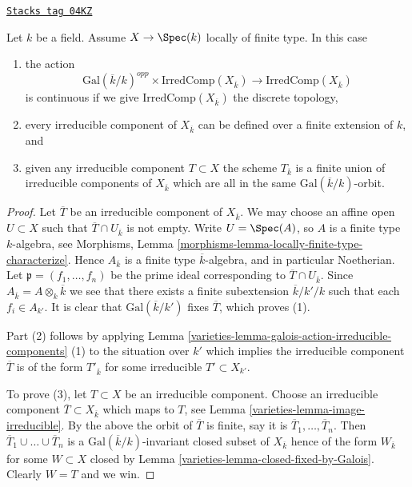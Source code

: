 \begin{lemma}
\label{varieties-lemma-galois-action-irreducible-components-locally-finite-type}
\href{https://stacks.math.columbia.edu/tag/04KZ}{\texttt{Stacks tag 04KZ}}

Let $k$ be a field.
Assume $X \to \Spec(k)$ locally of finite type.
In this case
\begin{enumerate}
\item the action
$$
\text{Gal}(\overline{k}/k)^{opp} \times \text{IrredComp}(X_{\overline{k}})
\longrightarrow
\text{IrredComp}(X_{\overline{k}})
$$
is continuous if we give $\text{IrredComp}(X_{\overline{k}})$ the discrete
topology,
\item every irreducible component of $X_{\overline{k}}$
can be defined over a finite extension of $k$, and
\item given any irreducible component $T \subset X$ the scheme
$T_{\overline{k}}$ is a finite union of irreducible components of
$X_{\overline{k}}$ which are all in the same
$\text{Gal}(\overline{k}/k)$-orbit.
\end{enumerate}
\end{lemma}

\begin{proof}

Let $\overline{T}$ be an irreducible component of $X_{\overline{k}}$.
We may choose an affine open $U \subset X$ such that
$\overline{T} \cap U_{\overline{k}}$ is not empty.
Write $U = \Spec(A)$, so $A$ is a finite type $k$-algebra, see
Morphisms, Lemma \ref{morphisms-lemma-locally-finite-type-characterize}.
Hence $A_{\overline{k}}$ is a finite type $\overline{k}$-algebra,
and in particular Noetherian. Let $\mathfrak p = (f_1, \ldots, f_n)$
be the prime ideal corresponding to $\overline{T} \cap U_{\overline{k}}$.
Since $A_{\overline{k}} = A \otimes_k \overline{k}$
we see that there exists a finite subextension
$\overline{k}/k'/k$ such that each $f_i \in A_{k'}$.
It is clear that $\text{Gal}(\overline{k}/k')$
fixes $\overline{T}$, which proves (1).

\medskip\noindent
Part (2) follows by applying
Lemma \ref{varieties-lemma-galois-action-irreducible-components} (1)
to the situation over $k'$ which implies the irreducible component
$\overline{T}$ is of the form $T'_{\overline{k}}$ for some irreducible
$T' \subset X_{k'}$.

\medskip\noindent
To prove (3), let $T \subset X$ be an irreducible component.
Choose an irreducible component $\overline{T} \subset X_{\overline{k}}$
which maps to $T$, see
Lemma \ref{varieties-lemma-image-irreducible}.
By the above the orbit of $\overline{T}$ is finite, say it is
$\overline{T}_1, \ldots, \overline{T}_n$. Then
$\overline{T}_1 \cup \ldots \cup \overline{T}_n$
is a $\text{Gal}(\overline{k}/k)$-invariant closed subset of $X_{\overline{k}}$
hence of the form $W_{\overline{k}}$ for some $W \subset X$ closed by
Lemma \ref{varieties-lemma-closed-fixed-by-Galois}.
Clearly $W = T$ and we win.
\end{proof}

